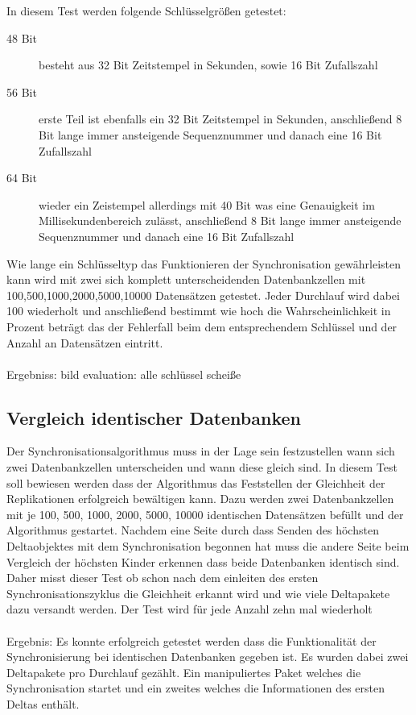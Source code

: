 \documentclass[a4paper,11pt,oneside,%
headsepline,												%
footsepline,												%
bibtotocnumbered									%
]{scrreprt}
\begin{document}
In diesem Test werden folgende Schlüsselgrößen getestet:
\begin{description}
	\item[48 Bit] besteht aus 32 Bit Zeitstempel in Sekunden, sowie 16 Bit Zufallszahl
	\item[56 Bit] erste Teil ist ebenfalls ein 32 Bit Zeitstempel in Sekunden, anschließend 8 Bit lange immer ansteigende Sequenznummer und danach eine 16 Bit Zufallszahl
	\item[64 Bit] wieder ein Zeistempel allerdings mit 40 Bit was eine Genauigkeit im Millisekundenbereich zulässt, anschließend 8 Bit lange immer ansteigende Sequenznummer und danach eine 16 Bit Zufallszahl
\end{description}
	
Wie lange ein Schlüsseltyp das Funktionieren der Synchronisation gewährleisten kann wird mit zwei sich komplett unterscheidenden Datenbankzellen mit 100,500,1000,2000,5000,10000  Datensätzen getestet. Jeder Durchlauf wird dabei 100 wiederholt und anschließend bestimmt wie hoch die Wahrscheinlichkeit in Prozent beträgt das der Fehlerfall beim dem entsprechendem Schlüssel und der Anzahl an Datensätzen eintritt.\\\\
Ergebniss:
bild %
evaluation: alle schlüssel scheiße %
\subsection{Vergleich identischer Datenbanken}
Der Synchronisationsalgorithmus muss in der Lage sein festzustellen wann sich zwei Datenbankzellen unterscheiden und wann diese gleich sind. In diesem Test soll bewiesen werden dass der Algorithmus das Feststellen der Gleichheit der Replikationen erfolgreich bewältigen kann. Dazu werden zwei Datenbankzellen mit je 100, 500, 1000, 2000, 5000, 10000 identischen Datensätzen befüllt und der Algorithmus gestartet. Nachdem eine Seite durch dass Senden des höchsten Deltaobjektes mit dem Synchronisation begonnen hat muss die andere Seite beim Vergleich der höchsten Kinder erkennen dass beide Datenbanken identisch sind. Daher misst dieser Test ob schon nach dem einleiten des ersten Synchronisationszyklus die Gleichheit erkannt wird und wie viele Deltapakete dazu versandt werden. Der Test wird für jede Anzahl zehn mal wiederholt\\\\
Ergebnis: Es konnte erfolgreich getestet werden dass die Funktionalität der Synchronisierung bei identischen Datenbanken gegeben ist. Es wurden dabei zwei Deltapakete pro Durchlauf gezählt. Ein manipuliertes Paket welches die Synchronisation startet und ein zweites welches die Informationen des ersten Deltas enthält.
\end{document}
